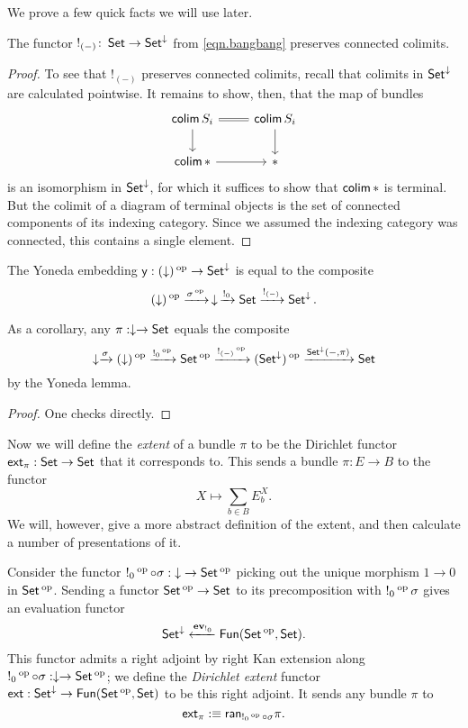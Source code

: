 We prove a few quick facts we will use later.
\begin{lem}\label{lem:bang.preserves.connected.colimits}
  The functor $!_{(-)}\colon\Set\to\Set^{\down}$ from \eqref{eqn.bangbang} preserves connected colimits.
\end{lem}
\begin{proof}
  To see that $!_{(-)}$ preserves connected colimits, recall that colimits in $\Set^{\down}$ are calculated pointwise. It remains to show, then, that the map of bundles
  \[
    \begin{tikzcd}
    \colim S_i \arrow[r, equals] \arrow[d] & \colim S_i \arrow[d] \\
    \colim \ast \arrow[r] & \ast 
    \end{tikzcd}
  \]
  is an isomorphism in $\Set^{\down}$, for which it suffices to show that
  $\colim \ast$ is terminal. But the colimit of a diagram of terminal objects is the set
  of connected components of its indexing category. Since we assumed the
  indexing category was connected, this contains a single element.
\end{proof}

\begin{lem}\label{lem:set.bundle.yoneda}
The Yoneda embedding $\yo : (\downarrow)\op \to \Set^{\downarrow}$ is equal to the
composite $$(\downarrow)\op \xto{\sigma\op} \,\downarrow\, \xto{!_{0}} \Set
\xto{!_{(-)}} \Set^{\downarrow}.$$

As a corollary, any $\pi : \downarrow \to \Set$ equals the composite
$$\downarrow \xto{\sigma} (\downarrow)\op \xto{!_0\op} \Set\op \xto{!_{(-)}\op}
(\Set^{\downarrow})\op \xto{\Set^{\downarrow}(-, \pi)} \Set$$
by the Yoneda lemma.
\end{lem}
\begin{proof}
One checks directly.
\end{proof}

Now we will define the \emph{extent} of a bundle $\pi$ to be the Dirichlet functor $\ext_\pi: \Set\to\Set$ that it
corresponds to. This sends a bundle
$\pi : E \to B$ to the functor
$$X \mapsto \sum_{b \in B} E_b^X.$$
We will, however, give a more abstract definition of the extent, and then
calculate a number of presentations of it.

\begin{defn}\label{def.extent}
  Consider the functor $!_0\op \circ \sigma : \down \to \Set\op$ picking out the
  unique morphism $1\to 0$ in $\Set\op$. Sending a functor $\Set\op\to\Set$ to
  its precomposition with $!_0\op \sigma$ gives an evaluation functor
  $$\Set^{\down} \xleftarrow{\ev_{!_0}} \Fun(\Set\op, \Set).$$
  This functor admits a right adjoint by right Kan extension along $!_0\op \circ
  \sigma : \downarrow \to \Set\op$; we define the
  \emph{Dirichlet extent} functor $\ext : \Set^{\down} \to \Fun(\Set\op,
  \Set)$ to be this right adjoint. It sends any bundle $\pi$ to
  $$\ext_{\pi} :\equiv \term{ran}_{!_0\op \circ \sigma} \pi.$$
\end{defn}


